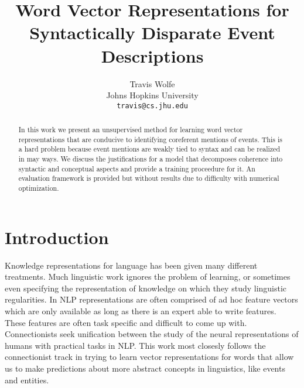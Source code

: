 \documentclass[11pt,letterpaper]{article}
\title{Word Vector Representations for \\
Syntactically Disparate Event Descriptions}
\author{Travis Wolfe\\
	    Johns Hopkins University \\
	    {\tt travis@cs.jhu.edu}
}
\date{}
\begin{document}
\maketitle
\begin{abstract}
In this work we present an unsupervised method for
learning word vector representations that are conducive to
identifying coreferent mentions of events. This is a hard problem
because event mentions are weakly tied to syntax and
can be realized in may ways.
We discuss the justifications for a model that decomposes
coherence into syntactic and conceptual aspects and
provide a training proceedure for it.
An evaluation framework is provided but without results due
to difficulty with numerical optimization.
\end{abstract}



\section{Introduction}
Knowledge representations for language has been given many different treatments.
Much linguistic work ignores the problem of learning, or sometimes even specifying
the representation of knowledge on which they study linguistic regularities.
In NLP representations are often comprised of ad hoc feature vectors which are
only available as long as there is an expert able to write features.
These features are often task specific and difficult to come up with.
Connectionists seek unification between the study of the neural representations
of humans with practical tasks in NLP.
This work most closesly follows the connectionist track in trying to learn
vector representations for words that allow us to make predictions about more
abstract concepts in linguistics, like events and entities.
\end{document}
